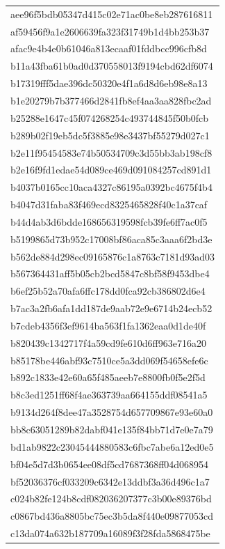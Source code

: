 \begin{tabular}{l}
aee96f5bdb05347d415c02e71ac0be8eb287616811 \\
af59456f9a1e2606639fa323f31749b1d4bb253b37 \\
afac9e4b4e0b61046a813ecaaf01fddbcc996cfb8d \\
b11a43fba61b0ad0d370558013f9194cbd62df6074 \\
b17319fff5dae396dc50320e4f1a6d8d6eb98e8a13 \\
b1e20279b7b377466d2841fb8ef4aa3aa828fbc2ad \\
b25288e1647c45f074268254c493744845f50b0fcb \\
b289b02f19eb5dc5f3885e98e3437bf55279d027c1 \\
b2e11f95454583e74b50534709c3d55bb3ab198cf8 \\
b2e16f9fd1edae54d089ce469d091084257cd891d1 \\
b4037b0165cc10aca4327c86195a0392bc4675f4b4 \\
b4047d31faba83f469ecd8325465828f40c1a37caf \\
b44d4ab3d6bdde168656319598fcb39fe6ff7ac0f5 \\
b5199865d73b952c17008bf86aca85c3aaa6f2bd3e \\
b562de884d298ec09165876c1a8763c7181d93ad03 \\
b567364431aff5b05cb2bcd5847c8bf58f9453dbe4 \\
b6ef25b52a70afa6ffc178dd0fca92cb386802d6e4 \\
b7ac3a2fb6afa1dd187de9aab72e9e6714b24ecb52 \\
b7cdeb4356f3ef9614ba563f1fa1362eaa0d1de40f \\
b820439c1342717f4a59cd9fe610d6ff963e716a20 \\
b85178be446abf93c7510ce5a3dd069f54658efe6c \\
b892c1833e42e60a65f485aeeb7e8800fb0f5e2f5d \\
b8c3ed1251ff68f4ae363739aa664155ddf08541a5 \\
b9134d264f8dee47a3528754d657709867e93e60a0 \\
bb8c63051289b82dabf041e135f84bb71d7e0e7a79 \\
bd1ab9822c23045444880583c6fbc7abe6a12ed0e5 \\
bf04e5d7d3b0654ee08df5cd7687368ff04d068954 \\
bf52036376cf033209c6342e13ddbf3a36d496c1a7 \\
c024b82fe124b8cdf082036207377c3b00e89376bd \\
c0867bd436a8805bc75ec3b5da8f440e09877053cd \\
c13da074a632b187709a16089f3f28fda5868475be \\

\end{tabular}
